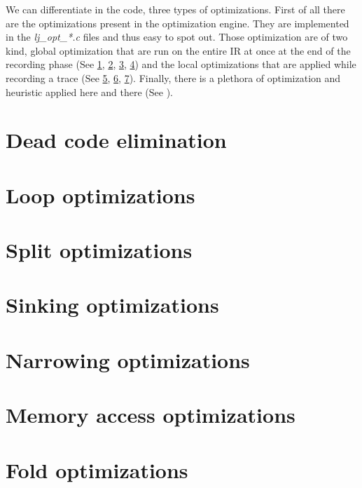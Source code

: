 
We can differentiate in the code, three types of optimizations.
First of all there are the optimizations present in the optimization engine.
They are implemented in the \emph{lj\_opt\_*.c} files and thus easy to spot out.
Those optimization are of two kind, global optimization that are run on the
entire IR at once at the end of the recording phase (See \ref{Sec:opt-dce}, \ref{Sec:opt-loop}, \ref{Sec:opt-split}, \ref{Sec:opt-sinking}) and the local
optimizations that are applied while recording a trace (See \ref{Sec:narrowing},
\ref{Sec:mao}, \ref{Sec:fold}).
Finally, there is a plethora of optimization and heuristic applied here and
there (See ).

\section{Dead code elimination}
\label{Sec:opt-dce}

\section{Loop optimizations}
\label{Sec:opt-loop}

\section{Split optimizations}
\label{Sec:opt-split}

\section{Sinking optimizations}
\label{Sec:opt-sinking}


\section{Narrowing optimizations}
\label{Sec:narrowing}

\section{Memory access optimizations}
\label{Sec:mao}

\section{Fold optimizations}
\label{Sec:fold}

